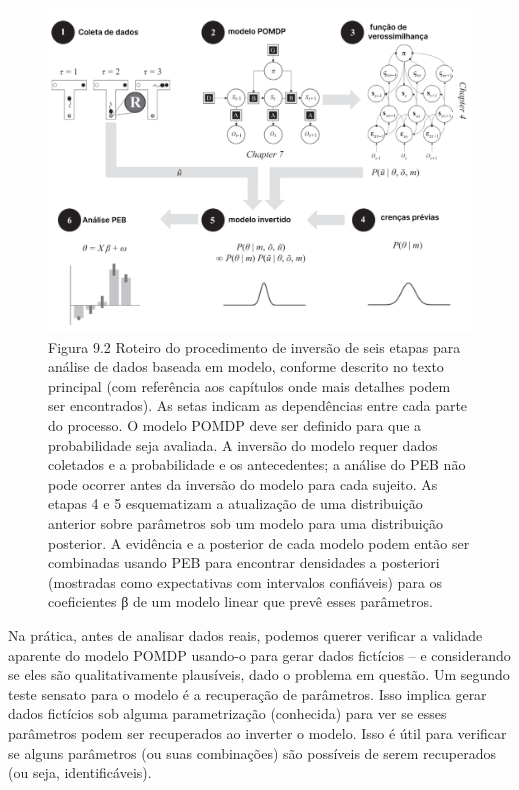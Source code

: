 \documentclass[
  12pt,
]{book}
\begin{document}
\begin{figure}
\centering
\includegraphics{images/Figura_9_2.png}
\caption{Figura 9.2 Roteiro do procedimento de inversão de seis etapas para análise de dados baseada em modelo, conforme descrito no texto principal (com referência aos capítulos onde mais detalhes podem ser encontrados). As setas indicam as dependências entre cada parte do processo. O modelo POMDP deve ser definido para que a probabilidade seja avaliada. A inversão do modelo requer dados coletados e a probabilidade e os antecedentes; a análise do PEB não pode ocorrer antes da inversão do modelo para cada sujeito. As etapas 4 e 5 esquematizam a atualização de uma distribuição anterior sobre parâmetros sob um modelo para uma distribuição posterior. A evidência e a posterior de cada modelo podem então ser combinadas usando PEB para encontrar densidades a posteriori (mostradas como expectativas com intervalos confiáveis) para os coeficientes β de um modelo linear que prevê esses parâmetros.}
\end{figure}

Na prática, antes de analisar dados reais, podemos querer verificar a validade aparente do modelo POMDP usando-o para gerar dados fictícios -- e considerando se eles são qualitativamente plausíveis, dado o problema em questão. Um segundo teste sensato para o modelo é a recuperação de parâmetros. Isso implica gerar dados fictícios sob alguma parametrização (conhecida) para ver se esses parâmetros podem ser recuperados ao inverter o modelo. Isso é útil para verificar se alguns parâmetros (ou suas combinações) são possíveis de serem recuperados (ou seja, identificáveis).
\end{document}
